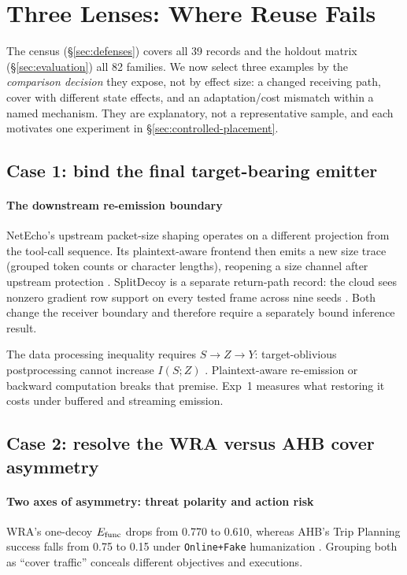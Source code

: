 \section{Three Lenses: Where Reuse Fails}\label{sec:discussion}
The census (\S\ref{sec:defenses}) covers all 39 records and the holdout matrix (\S\ref{sec:evaluation}) all 82 families. We now select three examples by the \emph{comparison decision} they expose, not by effect size: a changed receiving path, cover with different state effects, and an adaptation/cost mismatch within a named mechanism. They are explanatory, not a representative sample, and each motivates one experiment in \S\ref{sec:controlled-placement}.

\subsection{Case 1: bind the final target-bearing emitter}
\paragraph{The downstream re-emission boundary}
NetEcho's upstream packet-size shaping operates on a different projection from the tool-call sequence. Its plaintext-aware frontend then emits a new size trace (grouped token counts or character lengths), reopening a size channel after upstream protection \cite{netecho2025}. SplitDecoy is a separate return-path record: the cloud sees nonzero gradient row support on every tested frame across nine seeds \cite[Sections 5.1--5.3]{politis2026splitdecoy}. Both change the receiver boundary and therefore require a separately bound inference result.

The data processing inequality requires $S\to Z\to Y$: target-oblivious postprocessing cannot increase $I(S;Z)$ \cite[Theorem~2.8.1]{cover2006elements}. Plaintext-aware re-emission or backward computation breaks that premise. Exp~1 measures what restoring it costs under buffered and streaming emission.

\subsection{Case 2: resolve the WRA versus AHB cover asymmetry}
\paragraph{Two axes of asymmetry: threat polarity and action risk}
WRA's one-decoy $E_{\rm func}$ drops from 0.770 to 0.610, whereas AHB's Trip Planning success falls from 0.75 to 0.15 under \texttt{Online+Fake} humanization \cite{jeong2026wra,zhu2026turing}. Grouping both as ``cover traffic'' conceals different objectives and executions.

